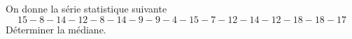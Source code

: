 
On donne la série statistique suivante  $$15-8-14-12-8-14-9-9-4-15-7-12-14-12-18-18-17$$
Déterminer la médiane.